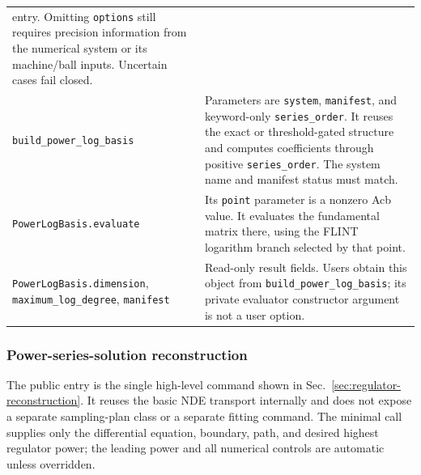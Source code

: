 \documentclass[11pt]{article}
\begin{document}
\begin{longtable}{L{0.36\textwidth}L{0.58\textwidth}}
entry.  Omitting \texttt{options} still requires precision information from the numerical
system or its machine/ball inputs.  Uncertain cases fail closed. \\
\texttt{build\_power\_log\_basis} & Parameters are \texttt{system}, \texttt{manifest}, and
keyword-only \texttt{series\_order}.  It reuses the exact or
threshold-gated structure and computes coefficients through positive
\texttt{series\_order}.  The system name and manifest status must match. \\
\texttt{PowerLogBasis.evaluate} & Its \texttt{point} parameter is a nonzero Acb value.  It
evaluates the fundamental matrix there, using the FLINT logarithm branch selected by that
point. \\
\texttt{PowerLogBasis.dimension}, \texttt{maximum\_log\_degree}, \texttt{manifest} &
Read-only result fields.  Users obtain this object from \texttt{build\_power\_log\_basis};
its private evaluator constructor argument is not a user option. \\
\bottomrule
\end{longtable}
\normalsize

\subsubsection{Power-series-solution reconstruction}

The public entry is the single high-level command shown in
Sec.~\ref{sec:regulator-reconstruction}.  It reuses the basic NDE transport internally and
does not expose a separate sampling-plan class or a separate fitting command.
The minimal call supplies only the differential equation, boundary, path, and desired highest
regulator power; the leading power and all numerical controls are automatic unless overridden.
\end{document}
